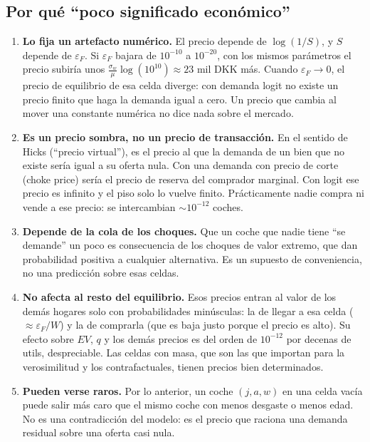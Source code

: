 \documentclass{article}
\begin{document}
\subsection{Por qué ``poco significado económico''}

\begin{enumerate}
  \item \textbf{Lo fija un artefacto numérico.} El precio depende de $\log(1/S)$, y $S$ depende de
  $\varepsilon_F$. Si $\varepsilon_F$ bajara de $10^{-10}$ a $10^{-20}$, con los mismos
  parámetros el precio subiría unos $\frac{\sigma_w}{\mu}\log(10^{10})\approx23$ mil DKK más. Cuando $\varepsilon_F\to0$,
  el precio de equilibrio de esa celda diverge: con demanda logit no existe un precio finito que haga
  la demanda igual a cero. Un precio que cambia al mover una constante numérica no dice nada sobre
  el mercado.
  \item \textbf{Es un precio sombra, no un precio de transacción.} En el sentido de Hicks (``precio
  virtual''), es el precio al que la demanda de un bien que no existe sería igual a su oferta nula.
  Con una demanda con precio de corte (choke price) sería el precio de reserva del comprador marginal.
  Con logit ese precio es infinito y el piso solo lo vuelve finito. Prácticamente nadie compra ni vende
  a ese precio: se intercambian $\sim10^{-12}$ coches.
  \item \textbf{Depende de la cola de los choques.} Que un coche que nadie tiene ``se demande'' un
  poco es consecuencia de los choques de valor extremo, que dan probabilidad positiva a cualquier
  alternativa. Es un supuesto de conveniencia, no una predicción sobre esas celdas.
  \item \textbf{No afecta al resto del equilibrio.} Esos precios entran al valor de los demás hogares
  solo con probabilidades minúsculas: la de llegar a esa celda ($\approx\varepsilon_F/W$) y la de
  comprarla (que es baja justo porque el precio es alto). Su efecto sobre $EV$, $q$ y los demás precios
  es del orden de $10^{-12}$ por decenas de utils, despreciable. Las celdas con masa, que son las que
  importan para la verosimilitud y los contrafactuales, tienen precios bien determinados.
  \item \textbf{Pueden verse raros.} Por lo anterior, un coche $(j,a,w)$ en una celda vacía puede salir
  más caro que el mismo coche con menos desgaste o menos edad. No es una contradicción del modelo: es
  el precio que raciona una demanda residual sobre una oferta casi nula.
\end{enumerate}
\end{document}
